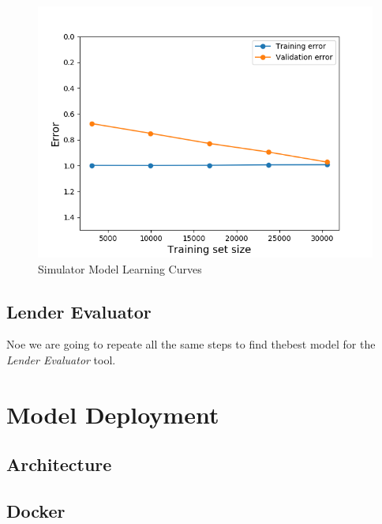 \begin{Schunk}
\begin{figure}[H]

{\centering \includegraphics[width=1\linewidth]{../../models/training/simulator_rf_tuned_large_curves} 

}

\caption[Simulator Model Learning Curves]{Simulator Model Learning Curves}\label{fig:simulator_lc}
\end{figure}
\end{Schunk}

\hypertarget{lender-evaluator}{%
\subsection{Lender Evaluator}\label{lender-evaluator}}

Noe we are going to repeate all the same steps to find thebest model for
the \emph{Lender Evaluator} tool.

\hypertarget{model-deployment}{%
\section{Model Deployment}\label{model-deployment}}

\hypertarget{architecture}{%
\subsection{Architecture}\label{architecture}}

\hypertarget{docker}{%
\subsection{Docker}\label{docker}}

